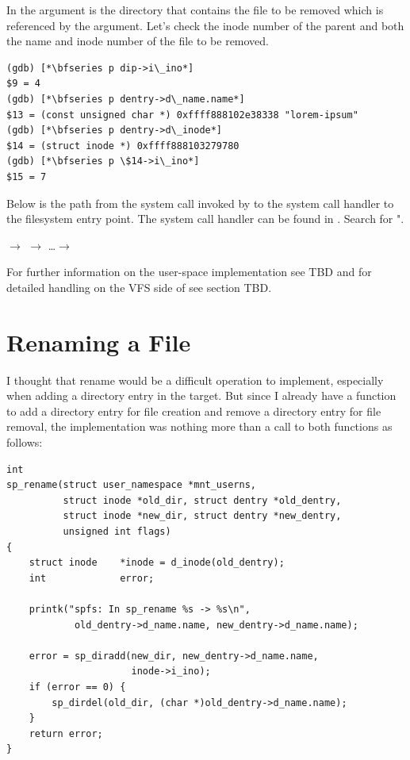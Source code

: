 \noindent
In  the  argument is the directory that contains the file to be removed which is referenced by the  argument. Let's check the inode number of the parent and both the name and inode number of the file to be removed.

\begin{lstlisting}
(gdb) [*\bfseries p dip->i\_ino*]
$9 = 4
(gdb) [*\bfseries p dentry->d\_name.name*]
$13 = (const unsigned char *) 0xffff888102e38338 "lorem-ipsum"
(gdb) [*\bfseries p dentry->d\_inode*]
$14 = (struct inode *) 0xffff888103279780
(gdb) [*\bfseries p \$14->i\_ino*]
$15 = 7
\end{lstlisting}

\noindent
Below is the path from the  system call invoked by  to the system call handler to the filesystem entry point. The  system call handler can be found in . Search for ".

\small
\bigskip
{} $\rightarrow$   $\rightarrow$ \ldots $\rightarrow$ 

\bigskip
\normalsize
\noindent
For further information on the user-space implementation see TBD and for detailed handling on the VFS side of  see section TBD.


\section{Renaming a File}

I thought that rename would be a difficult operation to implement, especially when adding a directory entry in the target. But since I already have a function to add a directory entry for file creation and remove a directory entry for file removal, the  implementation was nothing more than a call to both functions as follows:

\begin{lstlisting}
int
sp_rename(struct user_namespace *mnt_userns, 
          struct inode *old_dir, struct dentry *old_dentry, 
          struct inode *new_dir, struct dentry *new_dentry, 
          unsigned int flags)
{
    struct inode    *inode = d_inode(old_dentry);
    int             error;

    printk("spfs: In sp_rename %s -> %s\n", 
            old_dentry->d_name.name, new_dentry->d_name.name);

    error = sp_diradd(new_dir, new_dentry->d_name.name, 
                      inode->i_ino);
    if (error == 0) {
        sp_dirdel(old_dir, (char *)old_dentry->d_name.name);
    }
    return error;
}
\end{lstlisting}

